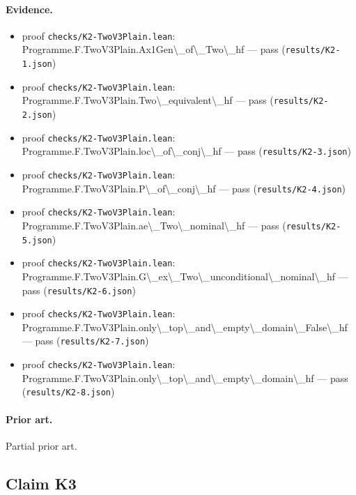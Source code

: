 \documentclass{article}
\begin{document}
\paragraph{Evidence.}
\begin{itemize}
\item proof \texttt{checks/K2-TwoV3Plain.lean}: Programme.F.TwoV3Plain.Ax1Gen\textbackslash{}\_of\textbackslash{}\_Two\textbackslash{}\_hf --- pass (\texttt{results/K2-1.json})
\item proof \texttt{checks/K2-TwoV3Plain.lean}: Programme.F.TwoV3Plain.Two\textbackslash{}\_equivalent\textbackslash{}\_hf --- pass (\texttt{results/K2-2.json})
\item proof \texttt{checks/K2-TwoV3Plain.lean}: Programme.F.TwoV3Plain.loc\textbackslash{}\_of\textbackslash{}\_conj\textbackslash{}\_hf --- pass (\texttt{results/K2-3.json})
\item proof \texttt{checks/K2-TwoV3Plain.lean}: Programme.F.TwoV3Plain.P\textbackslash{}\_of\textbackslash{}\_conj\textbackslash{}\_hf --- pass (\texttt{results/K2-4.json})
\item proof \texttt{checks/K2-TwoV3Plain.lean}: Programme.F.TwoV3Plain.ae\textbackslash{}\_Two\textbackslash{}\_nominal\textbackslash{}\_hf --- pass (\texttt{results/K2-5.json})
\item proof \texttt{checks/K2-TwoV3Plain.lean}: Programme.F.TwoV3Plain.G\textbackslash{}\_ex\textbackslash{}\_Two\textbackslash{}\_unconditional\textbackslash{}\_nominal\textbackslash{}\_hf --- pass (\texttt{results/K2-6.json})
\item proof \texttt{checks/K2-TwoV3Plain.lean}: Programme.F.TwoV3Plain.only\textbackslash{}\_top\textbackslash{}\_and\textbackslash{}\_empty\textbackslash{}\_domain\textbackslash{}\_False\textbackslash{}\_hf --- pass (\texttt{results/K2-7.json})
\item proof \texttt{checks/K2-TwoV3Plain.lean}: Programme.F.TwoV3Plain.only\textbackslash{}\_top\textbackslash{}\_and\textbackslash{}\_empty\textbackslash{}\_domain\textbackslash{}\_hf --- pass (\texttt{results/K2-8.json})
\end{itemize}

\paragraph{Prior art.} Partial prior art.

\subsection*{Claim K3}
\end{document}
